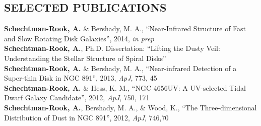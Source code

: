 \documentclass[11pt, margin]{res_hacked_long}
\begin{document}
\begin{resume}
\section{SELECTED PUBLICATIONS} 
{\bf Schechtman-Rook, A.} \& Bershady, M. A., ``Near-Infrared Structure
of Fast and Slow Rotating Disk Galaxies'', 2014, {\it in prep}\\
{\bf Schechtman-Rook, A.}, Ph.D. Dissertation: ``Lifting the Dusty
Veil: Understanding the Stellar Structure of Spiral Disks''\\
{\bf Schechtman-Rook, A.} \& Bershady, M. A., ``Near-infrared Detection
of a Super-thin Disk in NGC 891'', 2013, {\it ApJ}, 773, 45\\
{\bf Schechtman-Rook, A.} \& Hess, K. M., ``NGC 4656UV: A UV-selected
Tidal Dwarf Galaxy Candidate'', 2012, {\it ApJ}, 750, 171\\
{\bf Schechtman-Rook, A.}, Bershady, M. A., \& Wood, K., ``The
Three-dimensional Distribution of Dust in NGC 891'', 2012, {\it ApJ}, 746,70

 
\end{resume} 
\end{document}
